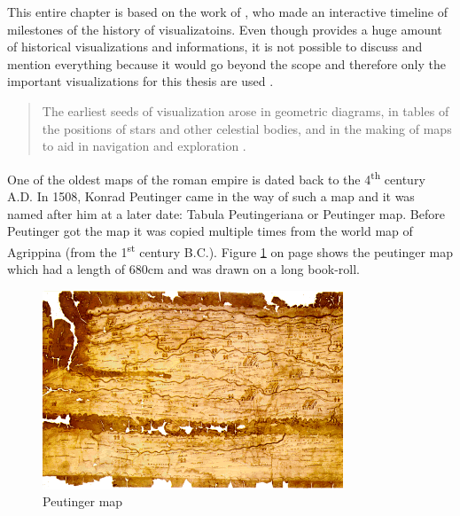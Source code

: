 This entire chapter is based on the work of \citeauthor{Friendly.2001}, who made an interactive timeline of milestones of the history of visualizatoins. Even though \citeauthor{Friendly.2001} provides a huge amount of historical visualizations and informations, it is not possible to discuss and mention everything because it would go beyond the scope and therefore only the important visualizations for this thesis are used .

\begin{quote}
    The earliest seeds of visualization arose in geometric diagrams, in tables of the positions of stars and other celestial bodies, and in the making of maps to aid in navigation and exploration .
\end{quote}

One of the oldest maps of the roman empire is dated back to the 4\textsuperscript{th} century A.D. In 1508, Konrad Peutinger came in the way of such a map and it was named after him at a later date: Tabula Peutingeriana or Peutinger map. Before Peutinger got the map it was copied multiple times from the world map of Agrippina (from the 1\textsuperscript{st} century B.C.). Figure \ref{fig:peutinger} on page \pageref{fig:peutinger} shows the peutinger map which had a length of 680cm and was drawn on a long book-roll.

\begin{figure}[!htb]
\centering
\includegraphics[width=0.8\textwidth,keepaspectratio]{images/history/peutinger.png}
\caption[
    Peutinger map, Urldate: 07.2016 \newline
\small\texttt{\url{https://web.archive.org/web/20080129123649/http://www.kargi.de/Geschichte/Peutinger/Peutinger.bmp}}
]{Peutinger map}
\label{fig:peutinger}
\end{figure}

